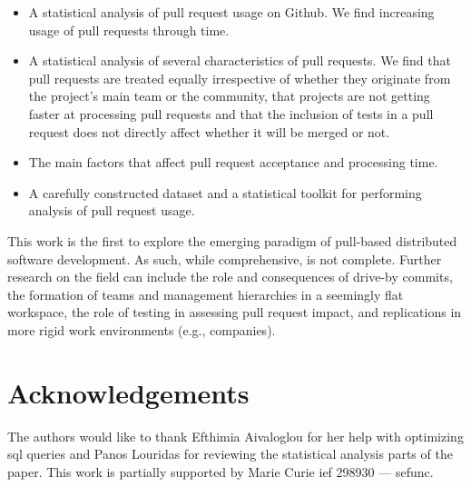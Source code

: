 \documentclass{sig-alternate}
\begin{document}
\begin{itemize}

  \item A statistical analysis of pull request usage on Github.
    We find increasing usage of pull requests through time.

  \item A statistical analysis of several characteristics of pull requests.
    We find that pull requests are treated equally irrespective of whether they
    originate from the project's main team or the community, that projects
    are not getting faster at processing pull requests and that the inclusion of
    tests in a pull request does not directly affect whether it will be merged or not.

  \item The main factors that affect pull request acceptance and
    processing time. 

  \item A carefully constructed dataset and a statistical toolkit for
    performing analysis of pull request usage.

\end{itemize}


This work is the first to explore the emerging paradigm of pull-based
distributed software development. As such, while comprehensive, is not complete.
Further research on the field can include the role and consequences of drive-by
commits, the formation of teams and management hierarchies in a seemingly flat
workspace, the role of testing in assessing pull request impact, and
replications in more rigid work environments (e.g., companies).

\section*{Acknowledgements}

The authors would like to thank Efthimia Aivaloglou for her help with 
optimizing {\sc sql} queries and Panos Louridas for reviewing the 
statistical analysis parts of the paper.
This work is partially supported by Marie Curie {\sc ief} 298930 --- {\sc sefunc}.


\balance

\end{document}
